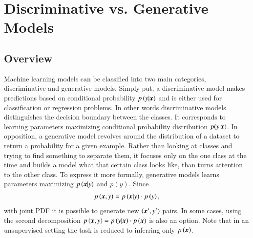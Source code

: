 
\section{Discriminative vs. Generative Models}\label{discriminative_modelinmg}
\subsection{Overview}
Machine learning models can be classified into two main categories, discriminative and generative models. Simply put, a discriminative model makes predictions based on conditional probability $p\left(y|\boldsymbol{x}\right)$ and is either used for classification or regression problems. In other words discriminative models distinguishes the decision boundary between the
classes.  It corresponds to learning parameters maximizing conditional probability
distribution $p(y|\boldsymbol{x})$. In opposition, a generative model revolves around the distribution of a dataset to return a probability for a given example. Rather than
looking at classes and trying to find something to separate them, it focuses
only on the one class at the time and builds a model what that certain class looks like, than turns attention to the other class. To express it more formally, generative models learns parameters maximizing $p\left(\boldsymbol{x}|y \right)$ and $p\left(y\right)$. Since
\begin{align}\label{eq:prob_decompostion}
p\left(\boldsymbol{x},y\right) = p\left(\boldsymbol{x}|y\right)\cdot p\left(y\right),
\end{align}
with joint PDF it is possible to generate new $\left(\boldsymbol{x}',y'\right)$ pairs. In some cases, using the second decomposition $p\left(\boldsymbol{x},y\right) = p\left(y|\boldsymbol{x}\right)\cdot p\left(\boldsymbol{x}\right)$ is also an option.  Note that in an unsupervised setting the task is reduced to inferring only $p\left(\boldsymbol{x}\right)$.
